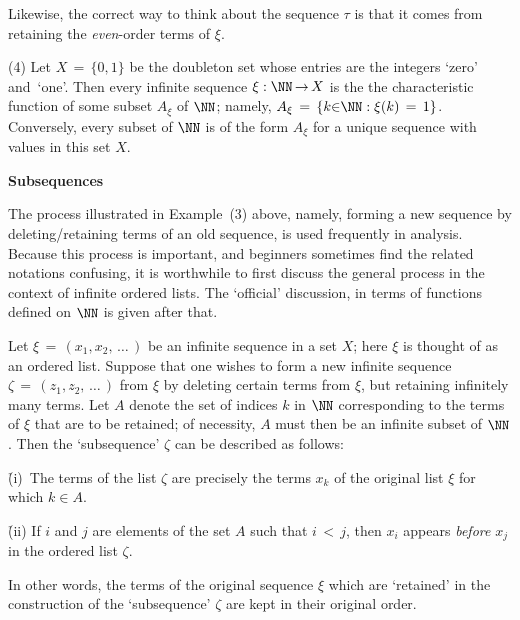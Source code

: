 {        Likewise, the correct way to think about the sequence ${\tau}$ is that it comes from retaining the {\em even}-order terms of ${\xi}$.

\V

        (4) Let $X \,=\, \{0,1\}$ be the doubleton set whose entries are the integers `zero' and~`one'.
    Then every infinite sequence ${\xi}:{\NN} \,{\rightarrow}\, X$ is the the characteristic function of some subset $A_{{\xi}}$ of ${\NN}$;
    namely, $A_{{\xi}} \,=\, \{k{\in}{\NN}: {\xi}(k) \,=\, 1\}$.
    Conversely, every subset of ${\NN}$ is of the form $A_{{\xi}}$ for a unique sequence with values in this set $X$.


\V
\V

        {\bf Subsequences}

\VV

    The process illustrated in Example~(3) above, namely, forming a new sequence by deleting/retaining terms of an old sequence,
    is used frequently in analysis.
    Because this process is important, and beginners sometimes find the related notations confusing, it is worthwhile to first discuss the general process in the context of infinite ordered lists.
    The `official' discussion, in terms of functions defined on ${\NN}$ is  given after that.

    Let ${\xi} \,=\, (x_{1},x_{2},\,{\ldots}\,)$ be an infinite sequence in a set $X$; here ${\xi}$ is thought of as an ordered list.
    Suppose that one wishes to form a new infinite sequence ${\zeta} \,=\, (z_{1},z_{2},\,{\ldots}\,)$ from ${\xi}$ by deleting certain terms from ${\xi}$, 
    but retaining infinitely many terms.
    Let $A$ denote the set of indices $k$ in ${\NN}$ corresponding to the terms of ${\xi}$ that are to be retained;
    of necessity, $A$ must then be an infinite subset of ${\NN}$. Then the `subsequence' ${\zeta}$ can be described as follows:

\VA

        \h (i)\, The terms of the list ${\zeta}$ are precisely the terms $x_{k}$ of the original list ${\xi}$ for which $k{\in}A$.

        \h (ii) If $i$ and $j$ are elements of the set $A$ such that $i\,<\,j$, then $x_{i}$ appears {\em before} $x_{j}$ in the ordered list ${\zeta}$.

\VA

\noindent In other words, the terms of the original sequence ${\xi}$ which are `retained'
    in the construction of the `subsequence' ${\zeta}$ are kept in their original order.

}
